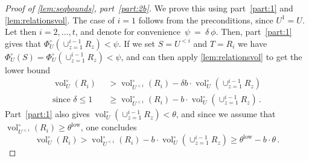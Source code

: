 \documentclass[epsfig,letter,11pt]{article}
\numberwithin{equation}{section}
\newcommand{\unvolc}[2]{\operatorname{vol}_{#2}^\circ (#1)}
\newcommand{\unspc}[2]{\Phi_{#2}^\circ (#1)}
\DeclareMathOperator*{\low}{low}
\begin{document}
 \begin{proof}[Proof of \cref{lem:seqbounds}, part~\eqref{part:2b}]
 	We prove this using part~\eqref{part:1} and \cref{lem:relationsvol}. The case of $i=1$ follows from the preconditions, since $U^1=U$. Let then $i =2, \dots, t$, and denote for convenience~$\psi~=~\delta~\phi$. Then, part~\eqref{part:1} gives that $\unspc{\cup_{z=1}^{i-1} R_z}{U} < \psi$. If we set $S=U^{<i}$ and $T=R_i$ we have $\unspc{S}{U} = \unspc{\cup_{z=1}^{i-1} R_z}{U} < \psi$, and can then apply \cref{lem:relationsvol} to get the lower bound
	\begin{align*}
		\unvolc{R_i}{U} & > \unvolc{R_i}{U^{<i}} - \delta b \cdot \unvolc{\cup_{z=1}^{i-1} R_z}{U} \\
		\text{since $\delta \le 1$} \quad & \ge  \unvolc{R_i}{U^{<i}} - b \cdot \unvolc{\cup_{z=1}^{i-1} R_z}{U} \, .
	\end{align*}
	Part~\eqref{part:1} also gives $\unvolc{\cup_{z=1}^{i-1} R_z}{U} < \theta $, and since we assume that $ \unvolc{R_i}{U^{<i}} \ge \theta^{\low}$, one concludes
		\begin{equation*}
		\unvolc{R_i}{U} > \unvolc{R_i}{U^{<i}} - b \cdot \unvolc{\cup_{z=1}^{i-1} R_z}{U}  \ge \theta^{\low} - b\cdot \theta \, .
	\end{equation*}
\end{proof}
\end{document}
